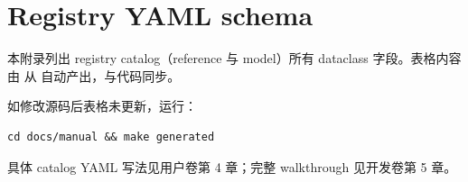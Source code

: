 
\chapter{Registry YAML schema}

本附录列出 \openbench{} registry catalog（reference 与 model）所有 dataclass 字段。表格内容由  从  自动产出，与代码同步。

如修改源码后表格未更新，运行：

\begin{verbatim}
cd docs/manual && make generated
\end{verbatim}

具体 catalog YAML 写法见用户卷第 4 章；完整 walkthrough 见开发卷第 5 章。


